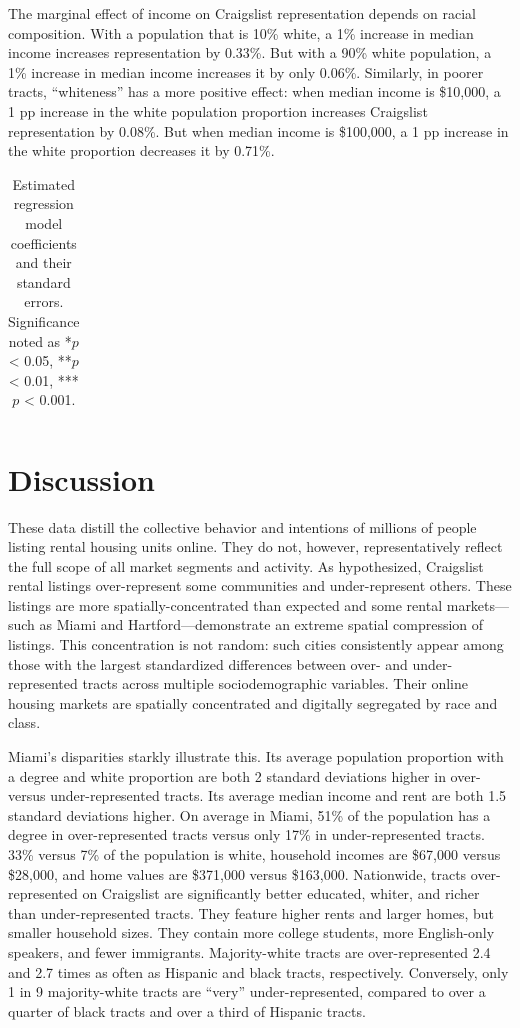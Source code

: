 \documentclass[11pt,onecolumn]{article} %
\begin{document}
The marginal effect of income on Craigslist representation depends on racial composition. With a population that is 10\% white, a 1\% increase in median income increases representation by 0.33\%. But with a 90\% white population, a 1\% increase in median income increases it by only 0.06\%. Similarly, in poorer tracts, \enquote{whiteness} has a more positive effect: when median income is \$10,000, a 1 pp increase in the white population proportion increases Craigslist representation by 0.08\%. But when median income is \$100,000, a 1 pp increase in the white proportion decreases it by 0.71\%.


\begin{small}
\begin{longtable}{l r r} 
	\caption{Estimated regression model coefficients and their standard errors. Significance noted as *$p$ < 0.05, **$p$ < 0.01, ***$p$ < 0.001.}
	\label{tab:regression_results}
	
\end{longtable}
\end{small}


\section{Discussion}

These data distill the collective behavior and intentions of millions of people listing rental housing units online. They do not, however, representatively reflect the full scope of all market segments and activity. As hypothesized, Craigslist rental listings over-represent some communities and under-represent others. These listings are more spatially-concentrated than expected and some rental markets---such as Miami and Hartford---demonstrate an extreme spatial compression of listings. This concentration is not random: such cities consistently appear among those with the largest standardized differences between over- and under-represented tracts across multiple sociodemographic variables. Their online housing markets are spatially concentrated and digitally segregated by race and class.

Miami's disparities starkly illustrate this. Its average population proportion with a degree and white proportion are both 2 standard deviations higher in over- versus under-represented tracts. Its average median income and rent are both 1.5 standard deviations higher. On average in Miami, 51\% of the population has a degree in over-represented tracts versus only 17\% in under-represented tracts. 33\% versus 7\% of the population is white, household incomes are \$67,000 versus \$28,000, and home values are \$371,000 versus \$163,000. Nationwide, tracts over-represented on Craigslist are significantly better educated, whiter, and richer than under-represented tracts. They feature higher rents and larger homes, but smaller household sizes. They contain more college students, more English-only speakers, and fewer immigrants. Majority-white tracts are over-represented 2.4 and 2.7 times as often as Hispanic and black tracts, respectively. Conversely, only 1 in 9 majority-white tracts are \enquote{very} under-represented, compared to over a quarter of black tracts and over a third of Hispanic tracts.
\end{document}

